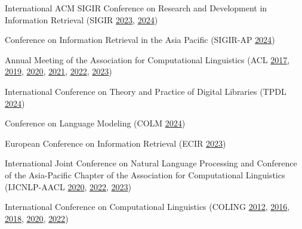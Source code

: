 \begin{itemize*}[label={},
                 itemjoin={{,\space}},
                 afterlabel={},
                 after={{.}}]

    \item International ACM SIGIR Conference on Research and Development in Information Retrieval
    (SIGIR
    \href{https://dl.acm.org/action/showFmPdf?doi=10.1145%2F3539618}{2023},
    \href{https://dl.acm.org/action/showFmPdf?doi=10.1145%2F3626772}{2024})

    \item Conference on Information Retrieval in the Asia Pacific
    (SIGIR-AP
    \href{https://dl.acm.org/action/showFmPdf?doi=10.1145%2F3673791}{2024})

    \item Annual Meeting of the Association for Computational Linguistics
    (ACL
    \href{https://aclanthology.org/P17-1000.pdf}{2017},
    \href{https://aclanthology.org/P19-1000.pdf}{2019},
    \href{https://aclanthology.org/2020.acl-main.0.pdf}{2020},
    \href{https://aclanthology.org/2021.acl-long.0.pdf}{2021},
    \href{https://aclanthology.org/2022.acl-long.0.pdf}{2022},
    \href{https://aclanthology.org/2023.acl-long.0.pdf}{2023})

    \item International Conference on Theory and Practice of Digital Libraries
    (TPDL
    \href{https://link.springer.com/book/10.1007/978-3-031-72437-4}{2024})

    \item Conference on Language Modeling
    (COLM
    \href{https://2024.colmweb.org/}{2024})

    \item European Conference on Information Retrieval
    (ECIR \href{https://link.springer.com/content/pdf/bfm:978-3-031-28244-7/1}{2023})

    \item 
    International Joint Conference on Natural Language Processing and Conference of the Asia-Pacific Chapter of the Association for Computational Linguistics (IJCNLP-AACL
    \href{https://aclanthology.org/2020.aacl-main.pdf}{2020},
    \href{https://aclanthology.org/2022.aacl-main.0.pdf}{2022},
    \href{https://aclanthology.org/2023.ijcnlp-main.0.pdf}{2023})

    \item International Conference on Computational Linguistics
    (COLING
    \href{https://aclanthology.org/C12-1000.pdf}{2012},
    \href{https://aclanthology.org/C16-1000.pdf}{2016},
    \href{https://aclanthology.org/C18-1000.pdf}{2018},
    \href{https://aclanthology.org/2020.coling-main.0.pdf}{2020},
    \href{https://aclanthology.org/2022.coling-1.0.pdf}{2022})


\end{itemize*}
